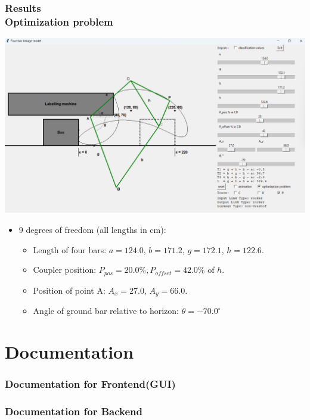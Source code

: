 \documentclass[ucs,10pt]{beamer}
\begin{document}
\begin{frame}
\frametitle{Results \\
	\small \color{rwth-blue} Optimization problem}
	\begin{center}
		\includegraphics[width=0.8\linewidth]{./Figures/optimization_problem_solution.png}
	\end{center}
	\begin{itemize}
		\item 9 degrees of freedom (all lengths in cm):
		\begin{itemize}
			\item Length of four bars: $a = 124.0$, $b = 171.2$, $g = 172.1$, $h = 122.6$.
			\item Coupler position: $P_{pos} = 20.0 \%, P_{offset} = 42.0 \%$ of $h$.
			\item Position of point A: $A_x = 27.0$, $A_y = 66.0$.
			\item Angle of ground bar relative to horizon: $\theta = -70.0^{\circ}$
		\end{itemize}
	\end{itemize}
\end{frame}

\section{Documentation}

\begin{frame}
\frametitle{Documentation for Frontend(GUI)}
	\centering
\end{frame}

\begin{frame}
\frametitle{Documentation for Backend}
	\centering
\end{frame}
\end{document}
